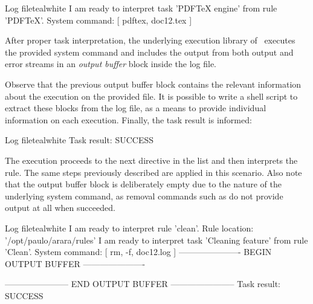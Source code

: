 \begin{codebox}{Log file}{teal}{\icnote}{white}
I am ready to interpret task 'PDFTeX engine' from rule 'PDFTeX'.
System command: [ pdftex, doc12.tex ]
\end{codebox}

After proper task interpretation, the underlying execution library of \arara\ executes the provided system command and includes the output from both output and error streams in an \emph{output buffer} block inside the log file.


Observe that the previous output buffer block contains the relevant information about the  execution on the provided file. It is possible to write a shell script to extract these blocks from the log file, as a means to provide individual information on each execution. Finally, the task result is informed:

\begin{codebox}{Log file}{teal}{\icnote}{white}
Task result: SUCCESS
\end{codebox}

The execution proceeds to the next directive in the list and then interprets the  rule. The same steps previously described are applied in this scenario. Also note that the output buffer block is deliberately empty due to the nature of the underlying system command, as removal commands such as  do not provide output at all when succeeded.

\begin{codebox}{Log file}{teal}{\icnote}{white}
I am ready to interpret rule 'clean'.
Rule location: '/opt/paulo/arara/rules'
I am ready to interpret task 'Cleaning feature' from rule 'Clean'.
System command: [ rm, -f, doc12.log ]
---------------------- BEGIN OUTPUT BUFFER ----------------------

----------------------- END OUTPUT BUFFER -----------------------
Task result: SUCCESS
\end{codebox}

